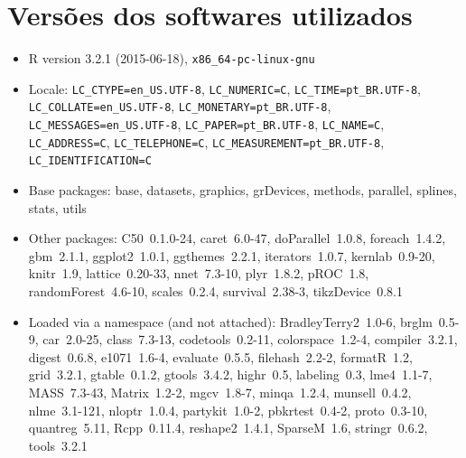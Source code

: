 \documentclass[a4paper,titlepage]{ppgi}\usepackage[]{graphicx}\usepackage[]{color}
\begin{document}
\chapter{Versões dos softwares utilizados}

\begin{itemize}\raggedright
  \item R version 3.2.1 (2015-06-18), \verb|x86_64-pc-linux-gnu|
  \item Locale: \verb|LC_CTYPE=en_US.UTF-8|, \verb|LC_NUMERIC=C|, \verb|LC_TIME=pt_BR.UTF-8|, \verb|LC_COLLATE=en_US.UTF-8|, \verb|LC_MONETARY=pt_BR.UTF-8|, \verb|LC_MESSAGES=en_US.UTF-8|, \verb|LC_PAPER=pt_BR.UTF-8|, \verb|LC_NAME=C|, \verb|LC_ADDRESS=C|, \verb|LC_TELEPHONE=C|, \verb|LC_MEASUREMENT=pt_BR.UTF-8|, \verb|LC_IDENTIFICATION=C|
  \item Base packages: base, datasets, graphics, grDevices,
    methods, parallel, splines, stats, utils
  \item Other packages: C50~0.1.0-24, caret~6.0-47,
    doParallel~1.0.8, foreach~1.4.2, gbm~2.1.1, ggplot2~1.0.1,
    ggthemes~2.2.1, iterators~1.0.7, kernlab~0.9-20, knitr~1.9,
    lattice~0.20-33, nnet~7.3-10, plyr~1.8.2, pROC~1.8,
    randomForest~4.6-10, scales~0.2.4, survival~2.38-3,
    tikzDevice~0.8.1
  \item Loaded via a namespace (and not attached):
    BradleyTerry2~1.0-6, brglm~0.5-9, car~2.0-25, class~7.3-13,
    codetools~0.2-11, colorspace~1.2-4, compiler~3.2.1,
    digest~0.6.8, e1071~1.6-4, evaluate~0.5.5, filehash~2.2-2,
    formatR~1.2, grid~3.2.1, gtable~0.1.2, gtools~3.4.2,
    highr~0.5, labeling~0.3, lme4~1.1-7, MASS~7.3-43,
    Matrix~1.2-2, mgcv~1.8-7, minqa~1.2.4, munsell~0.4.2,
    nlme~3.1-121, nloptr~1.0.4, partykit~1.0-2, pbkrtest~0.4-2,
    proto~0.3-10, quantreg~5.11, Rcpp~0.11.4, reshape2~1.4.1,
    SparseM~1.6, stringr~0.6.2, tools~3.2.1
\end{itemize}


%
%
%
\end{document}
